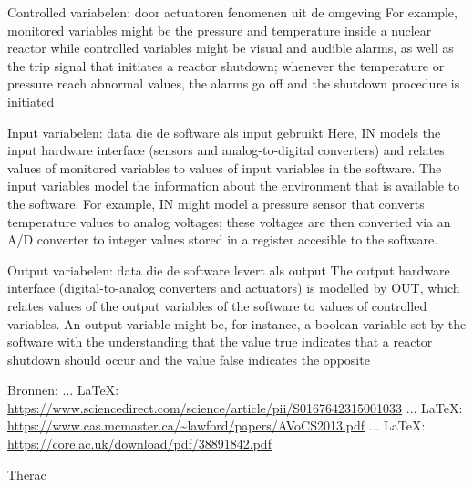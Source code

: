 \begin{thebibliography}{99}
Controlled variabelen: door actuatoren \bestuurde fenomenen uit de omgeving
For example, monitored variables might be the pressure and temperature
inside a nuclear reactor while controlled variables might be visual and audible alarms, as well
as the trip signal that initiates a reactor shutdown; whenever the temperature or pressure reach
abnormal values, the alarms go off and the shutdown procedure is initiated

Input variabelen: data die de software als input gebruikt
Here, IN models the input hardware interface (sensors and analog-to-digital converters) and
relates values of monitored variables to values of input variables in the software. The input variables model the information about the environment that is available to the software. For example,
IN might model a pressure sensor that converts temperature values to analog voltages; these voltages are then converted via an A/D converter to integer values stored in a register accesible to the
software.

Output variabelen: data die de software levert als output
The output hardware interface (digital-to-analog converters and actuators) is modelled
by OUT, which relates values of the output variables of the software to values of controlled variables. An output variable might be, for instance, a boolean variable set by the software with the
understanding that the value true indicates that a reactor shutdown should occur and the value
false indicates the opposite


Bronnen:
 ... \LaTeX:\\ \url{https://www.sciencedirect.com/science/article/pii/S0167642315001033}
 ... \LaTeX:\\ \url{https://www.cas.mcmaster.ca/~lawford/papers/AVoCS2013.pdf}
 ... \LaTeX:\\ \url{https://core.ac.uk/download/pdf/38891842.pdf}

Therac



\end{thebibliography}
